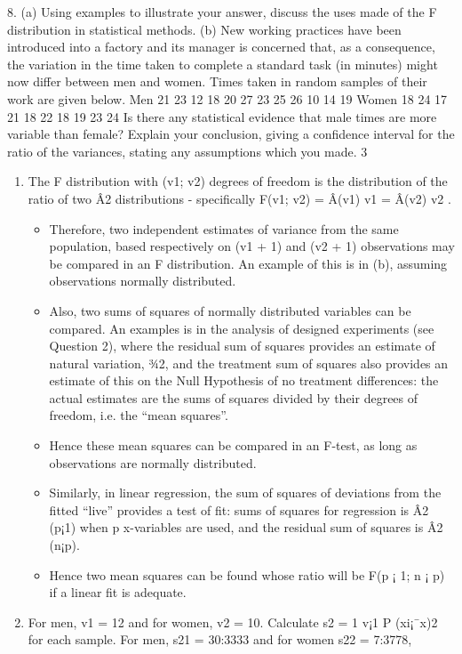 \documentclass[a4paper,12pt]{article}
\begin{document}
\begin{framed}
8. (a) Using examples to illustrate your answer, discuss the uses made of the F distribution in statistical methods.
(b) New working practices have been introduced into a factory and its manager is concerned that, as a consequence, the variation in the time taken to complete a standard task (in minutes) might now differ between men and women.  Times taken in random samples of their work are given below.
Men 21 23 12 18 20 27 23 25 26 10 14 19 Women 18 24 17 21 18 22 18 19 23 24
Is there any statistical evidence that male times are more variable than female?  Explain your conclusion, giving a confidence interval for the ratio of the variances, stating any assumptions which you made.
3
\end{framed}
\begin{enumerate}
\item The F distribution with (v1; v2) degrees of freedom is the distribution of the
ratio of two Â2 distributions - specifically F(v1; v2) = Â(v1)
v1
=
Â(v2)
v2
. 
\begin{itemize}
\item Therefore,
two independent estimates of variance from the same population, based respectively
on (v1 + 1) and (v2 + 1) observations may be compared in an F
distribution. An example of this is in (b), assuming observations normally
distributed.
\item Also, two sums of squares of normally distributed variables can be compared.
An examples is in the analysis of designed experiments (see Question
2), where the residual sum of squares provides an estimate of natural variation,
¾2, and the treatment sum of squares also provides an estimate of
this on the Null Hypothesis of no treatment differences: the actual estimates
are the sums of squares divided by their degrees of freedom, i.e. the “mean
squares”.
\item Hence these mean squares can be compared in an F-test, as long
as observations are normally distributed.
\item Similarly, in linear regression, the sum of squares of deviations from the fitted
“live” provides a test of fit: sums of squares for regression is Â2
(p¡1) when
p x-variables are used, and the residual sum of squares is Â2
(n¡p). 
\item Hence two
mean squares can be found whose ratio will be F(p ¡ 1; n ¡ p) if a linear fit
is adequate.
\end{itemize}
\item  For men, v1 = 12 and for women, v2 = 10. Calculate s2 = 1
v¡1
P
(xi¡¯x)2 for
each sample. For men, s21
= 30:3333 and for women s22
= 7:3778, 


\end{enumerate}
\end{document}
